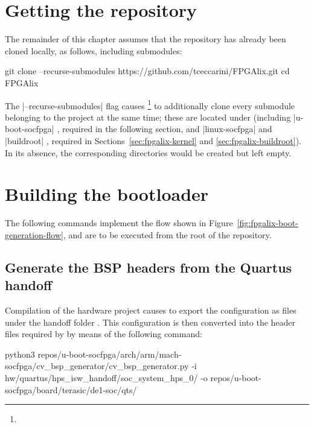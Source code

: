 \section{Getting the repository}

The remainder of this chapter assumes that the  repository has already been cloned locally, as follows, including submodules:

\begin{shellcodehost}
git clone --recurse-submodules https://github.com/tceccarini/FPGAlix.git
cd FPGAlix
\end{shellcodehost}

The |--recurse-submodules| flag causes \footnote{} to additionally clone every submodule belonging to the project at the same time; these are located under  (including |u-boot-socfpga| \cite{SUB-UBOOT}, required in the following section, and |linux-socfpga| \cite{SUB-LINUX} and |buildroot| \cite{SUB-BUILDROOT}, required in Sections~\ref{sec:fpgalix-kernel} and \ref{sec:fpgalix-buildroot}). In its absence, the corresponding directories would be created but left empty.

\section{Building the bootloader}
\label{sec:fpgalix-bootloader}

The following commands implement the flow shown in Figure~\ref{fig:fpgalix-boot-generation-flow}, and are to be executed from the root of the repository.

\subsection{Generate the BSP headers from the Quartus handoff}

Compilation of the hardware project causes  to export the  configuration as  files under the handoff folder . This configuration is then converted into the  header files required by  by means of the following command:

\begin{shellcodehost}
python3 repos/u-boot-socfpga/arch/arm/mach-socfpga/cv_bsp_generator/cv_bsp_generator.py
    -i hw/quartus/hps_isw_handoff/soc_system_hps_0/
    -o repos/u-boot-socfpga/board/terasic/de1-soc/qts/
\end{shellcodehost}

